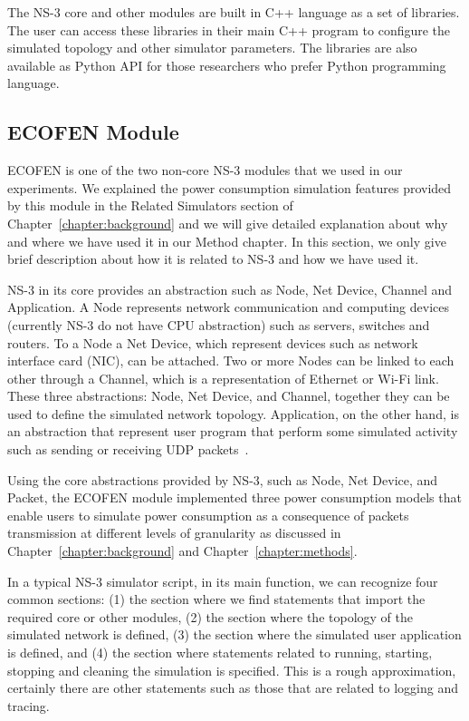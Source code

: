 The NS-3 core and other modules are built in C++ language as a set of libraries. The user can access these libraries in their main C++ program to configure the simulated topology and other simulator parameters. The libraries are also available as Python API for those researchers who prefer Python programming language. 

\subsection{ECOFEN Module}
ECOFEN is one of the two non-core NS-3 modules that we used in our experiments. We explained the power consumption simulation features provided by this module in the Related Simulators section of Chapter~\ref{chapter:background} and we will give detailed explanation about why and where we have used it in our Method chapter. In this section, we only give brief description about how it is related to NS-3 and how we have used it. 

NS-3 in its core provides an abstraction such as Node, Net Device, Channel and Application. A Node represents  network communication and computing devices (currently NS-3 do not have CPU abstraction) such as servers, switches and routers. To a Node a Net Device, which represent devices such as network interface card (NIC), can be attached. Two or more Nodes can be linked to each other through a Channel, which is a representation of Ethernet or Wi-Fi link. These three abstractions: Node, Net Device, and Channel, together they can be used to define the simulated network topology. Application, on the other hand, is an abstraction that represent user program that perform some simulated activity such as sending or receiving UDP packets~\cite{ns3}. 

Using the core abstractions provided by NS-3, such as  Node, Net Device, and Packet, the ECOFEN module implemented three power consumption models that enable users to simulate power consumption as a consequence of packets transmission at different levels of granularity as discussed in Chapter~\ref{chapter:background} and Chapter~\ref{chapter:methods}.

In a typical NS-3 simulator script, in its main function, we can recognize four common sections: (1) the section where we find statements that import the required core or other modules, (2) the section where the topology of the simulated network is defined, (3) the section where the simulated user application is defined, and (4) the section where statements related to running, starting, stopping and cleaning the simulation is specified. This is a rough approximation, certainly there are other statements such as those that are related to logging and tracing. 

